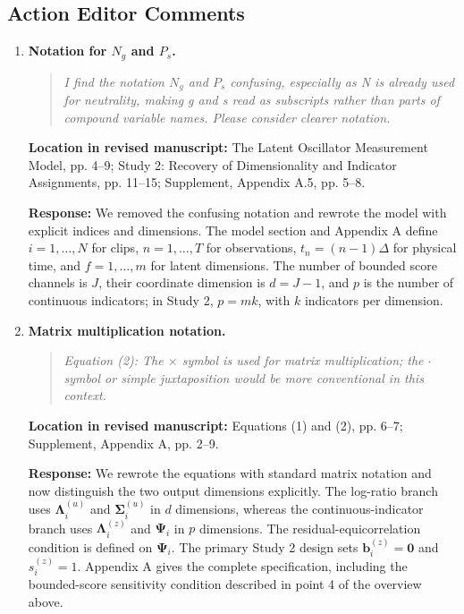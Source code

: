 \documentclass[11pt]{article}
\newenvironment{reviewquote}{\begin{quote}\small\itshape}{\end{quote}}
\newcommand{\point}[1]{\textbf{#1.}}
\newcommand{\location}[1]{\textbf{Location in revised manuscript:} #1\par}
\newcommand{\response}{\textbf{Response:} }
\begin{document}
\subsection*{Action Editor Comments}

\begin{enumerate}[resume]
  \item \point{Notation for \(N_g\) and \(P_s\)}
  \begin{reviewquote}
  I find the notation \(N_g\) and \(P_s\) confusing, especially as N is already used for neutrality, making g and s read as subscripts rather than parts of compound variable names. Please consider clearer notation.
  \end{reviewquote}
  \location{The Latent Oscillator Measurement Model, pp. 4--9; Study 2: Recovery of Dimensionality and Indicator Assignments, pp. 11--15; Supplement, Appendix A.5, pp. 5--8.}
  \response We removed the confusing notation and rewrote the model with explicit indices and dimensions. The model section and Appendix A define \(i=1,\ldots,N\) for clips, \(n=1,\ldots,T\) for observations, \(t_n=(n-1)\Delta\) for physical time, and \(f=1,\ldots,m\) for latent dimensions. The number of bounded score channels is \(J\), their coordinate dimension is \(d=J-1\), and \(p\) is the number of continuous indicators; in Study 2, \(p=mk\), with \(k\) indicators per dimension.

  \item \point{Matrix multiplication notation}
  \begin{reviewquote}
  Equation (2): The \(\times\) symbol is used for matrix multiplication; the \(\cdot\) symbol or simple juxtaposition would be more conventional in this context.
  \end{reviewquote}
  \location{Equations (1) and (2), pp. 6--7; Supplement, Appendix A, pp. 2--9.}
  \response We rewrote the equations with standard matrix notation and now distinguish the two output dimensions explicitly. The log-ratio branch uses \(\boldsymbol\Lambda_i^{(u)}\) and \(\boldsymbol\Sigma_i^{(u)}\) in \(d\) dimensions, whereas the continuous-indicator branch uses \(\boldsymbol\Lambda_i^{(z)}\) and \(\boldsymbol\Psi_i\) in \(p\) dimensions. The residual-equicorrelation condition is defined on \(\boldsymbol\Psi_i\). The primary Study 2 design sets \(\mathbf b_i^{(z)}=\mathbf 0\) and \(s_i^{(z)}=1\). Appendix A gives the complete specification, including the bounded-score sensitivity condition described in point 4 of the overview above.


\end{enumerate}
\end{document}
